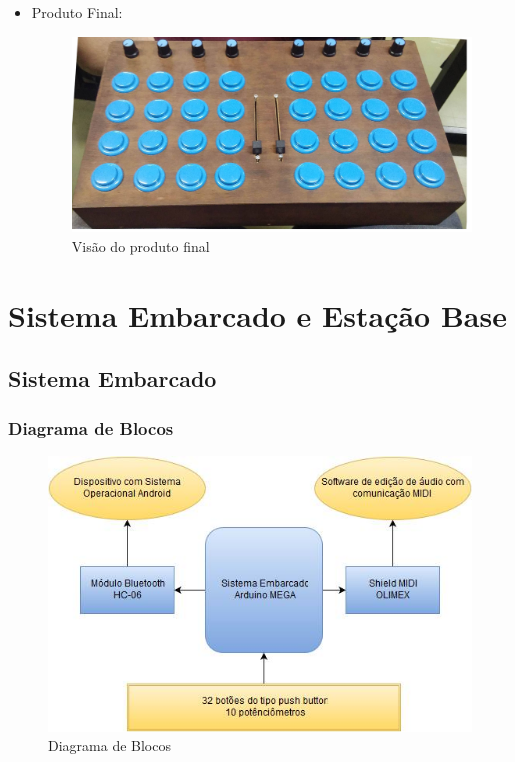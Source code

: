 \documentclass[hyperref={pdfpagelabels=false}]{beamer}
\begin{document}
\begin{frame}
\begin{itemize}
                  \item Produto Final:
                        \begin{figure}[H]
                        	\centering
                        	\includegraphics[scale=0.1]{Imagens/x02.png}
                        	\caption[Visão do produto final]{Visão do produto final}
                        	\label{fig:requisitos}
                        \end{figure}
                \end{itemize}

            \end{frame}

        \section{Sistema Embarcado e Estação Base}

            \subsection{Sistema Embarcado}

                \begin{frame}\frametitle{Diagrama de Blocos}

                    \begin{figure}[H]
                    	\centering
                    	\includegraphics[scale=0.4]{Imagens/Zi04.jpg}
                    	\caption[Diagrama de Blocos]{Diagrama de Blocos}
                    	\label{fig:requisitos}
                    \end{figure}

                \end{frame}
\end{document}
